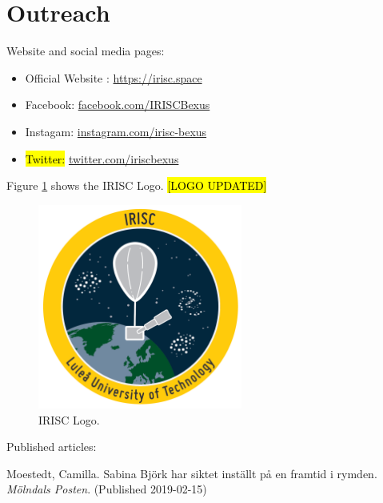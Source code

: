 \newpage
\section{Outreach} \label{sec:appB}

Website and social media pages: 

\begin{itemize}
	\item Official Website : \url{https://irisc.space}
	\item Facebook: \url{facebook.com/IRISCBexus}
	\item Instagam: \url{instagram.com/irisc-bexus}
	\item \hl{Twitter:} \url{twitter.com/iriscbexus}
\end{itemize}

Figure \ref{fig:loggo} shows the IRISC Logo. \hl{[LOGO UPDATED]}

\begin{figure}[H]
	\centering
	\includegraphics[width=0.6\textwidth]{0-cover/img/logo-irisc.png}
	\caption{IRISC Logo.}
	\label{fig:loggo}
\end{figure}

Published articles: 

Moestedt, Camilla. Sabina Björk har siktet inställt på en framtid i rymden. \textit{Mölndals Posten}. (Published 2019-02-15)